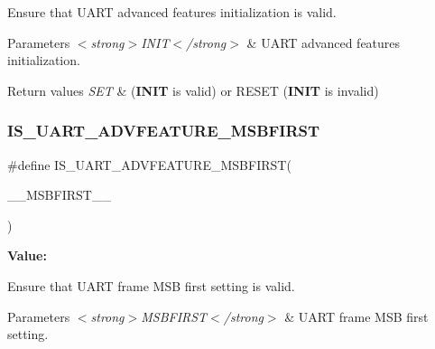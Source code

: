 Ensure that U\+A\+RT advanced features initialization is valid. 


\begin{DoxyParams}{Parameters}
{\em $<$strong$>$\+I\+N\+I\+T$<$/strong$>$} & U\+A\+RT advanced features initialization. \\
\hline
\end{DoxyParams}

\begin{DoxyRetVals}{Return values}
{\em S\+ET} & ({\bfseries{I\+N\+IT}} is valid) or R\+E\+S\+ET ({\bfseries{I\+N\+IT}} is invalid) \\
\hline
\end{DoxyRetVals}
\mbox{\label{group___u_a_r_t___private___macros_ga82289de330949918b037acf94fb12aef}} 
\subsubsection{\texorpdfstring{IS\_UART\_ADVFEATURE\_MSBFIRST}{IS\_UART\_ADVFEATURE\_MSBFIRST}}
{\footnotesize\ttfamily \#define I\+S\+\_\+\+U\+A\+R\+T\+\_\+\+A\+D\+V\+F\+E\+A\+T\+U\+R\+E\+\_\+\+M\+S\+B\+F\+I\+R\+ST(\begin{DoxyParamCaption}\item[{}]{\+\_\+\+\_\+\+M\+S\+B\+F\+I\+R\+S\+T\+\_\+\+\_\+ }\end{DoxyParamCaption})}

{\bfseries Value\+:}
\begin{DoxyCode}{0}

\end{DoxyCode}


Ensure that U\+A\+RT frame M\+SB first setting is valid. 


\begin{DoxyParams}{Parameters}
{\em $<$strong$>$\+M\+S\+B\+F\+I\+R\+S\+T$<$/strong$>$} & U\+A\+RT frame M\+SB first setting. \\
\hline
\end{DoxyParams}

